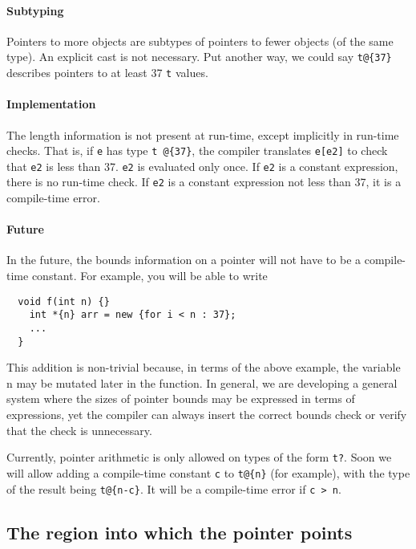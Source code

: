 \paragraph{Subtyping}
Pointers to more objects are subtypes of pointers to fewer objects (of
the same type).  An explicit cast is not necessary.  Put another way,
we could say \verb|t@{37}| describes pointers to at least 37 \texttt{t}
values.


\paragraph{Implementation}
The length information is not present at run-time, except implicitly
in run-time checks.  That is, if \texttt{e} has type \verb|t @{37}|, the
compiler translates \texttt{e[e2]} to check that \texttt{e2} is less than
37.  \texttt{e2} is evaluated only once.  If \texttt{e2} is a constant
expression, there is no run-time check.  If \texttt{e2} is a constant
expression not less than 37, it is a compile-time error.

\paragraph{Future}
In the future, the bounds information on a pointer will not have to be
a compile-time constant.  For example, you will be able to write

\begin{verbatim}
  void f(int n) {}
    int *{n} arr = new {for i < n : 37};
    ...
  }
\end{verbatim}

This addition is non-trivial because, in terms of the above example,
the variable n may be mutated later in the function.  In general,
we are developing a general system where the sizes of pointer bounds
may be expressed in terms of expressions, yet the compiler can always
insert the correct bounds check or verify that the check is
unnecessary.

Currently, pointer arithmetic is only allowed on types of the form
\texttt{t?}.  Soon we will allow adding a compile-time constant \texttt{c}
to \verb|t@{n}| (for example), with the type of the result being
\verb|t@{n-c}|.  It will be a compile-time error if \texttt{c > n}.

\subsection*{\hypertarget{pointer_region}{The region into which the
    pointer points}}

